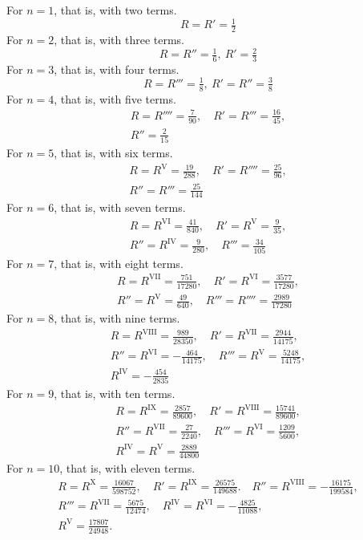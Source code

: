 For $n=1$, that is, with two terms.
\[
R=R'=\tfrac12
\]
For $n=2$, that is, with three terms.
\[
R=R''=\tfrac16,\ R'=\tfrac23
\]
For $n=3$, that is, with four terms.
\[
R=R'''=\tfrac18,\ R'=R''=\tfrac38
\]
For $n=4$, that is, with five terms.
\[
\begin{gathered}
R=R''''=\tfrac7{90},\quad R'=R'''=\tfrac{16}{45},\\[5pt]
R''=\tfrac2{15}
\end{gathered}
\]
For $n=5$, that is, with six terms.
\[
\begin{gathered}
R=R^{\mathrm{V}}=\tfrac{19}{288},\quad R'=R''''=\tfrac{25}{96},\\[5pt]
R''=R'''=\tfrac{25}{144}
\end{gathered}
\]
For $n=6$, that is, with seven terms.
\[
\begin{gathered}
R=R^{\mathrm{VI}}=\tfrac{41}{840},\quad R'=R^{\mathrm{V}}=\tfrac9{35},\\[5pt]
R''=R^{\mathrm{IV}}=\tfrac9{280},\quad R'''=\tfrac{34}{105}
\end{gathered}
\]
For $n=7$, that is, with eight terms.
\[
\begin{gathered}
R=R^{\mathrm{VII}}=\tfrac{751}{17280},\quad R'=R^{\mathrm{VI}}=\tfrac{3577}{17280},\\[5pt]
R''=R^{\mathrm{V}}=\tfrac{49}{640},\quad R'''=R''''=\tfrac{2989}{17280}
\end{gathered}
\]
For $n=8$, that is, with nine terms.
\[
\begin{gathered}
R=R^{\mathrm{VIII}}=\tfrac{989}{28350},\quad R'=R^{\mathrm{VII}}=\tfrac{2944}{14175},\\[5pt]
R''=R^{\mathrm{VI}}=-\tfrac{464}{14175},\quad R'''=R^{\mathrm{V}}=\tfrac{5248}{14175},\\[5pt]
R^{\mathrm{IV}}=-\tfrac{454}{2835}
\end{gathered}
\]
For $n=9$, that is, with ten terms.
\[
\begin{gathered}
R=R^{\mathrm{IX}}=\frac{2857}{89600},\quad R'=R^{\mathrm{VIII}}=\frac{15741}{89600},\\[5pt]
R''=R^{\mathrm{VII}}=\frac{27}{2240},\quad R'''=R^{\mathrm{VI}}=\frac{1209}{5600},\\[5pt]
R^{\mathrm{IV}}=R^{\mathrm{V}}=\frac{2889}{44800}
\end{gathered}
\]
For $n=10$, that is, with eleven terms.
\[
\begin{gathered}
R=R^{\mathrm{X}}=\frac{16067}{598752},\quad R'=R^{\mathrm{IX}}=\frac{26575}{149688}.\quad
R''=R^{\mathrm{VIII}}=-\frac{16175}{199584},\\[5pt]
R'''=R^{\mathrm{VII}}=\frac{5675}{12474},\quad R^{\mathrm{IV}}=R^{\mathrm{VI}}=-\frac{4825}{11088},\\[5pt]
R^{\mathrm{V}}=\frac{17807}{24948}.
\end{gathered}
\]

